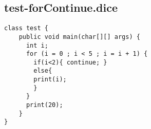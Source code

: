 \subsection{test-forContinue.dice}
\begin{verbatim}
class test {
	public void main(char[][] args) {
	  int i;
	  for (i = 0 ; i < 5 ; i = i + 1) {
	  	if(i<2){ continue; }
	  	else{
	    print(i);
	    }
	  }
	  print(20);
	}
}

\end{verbatim}